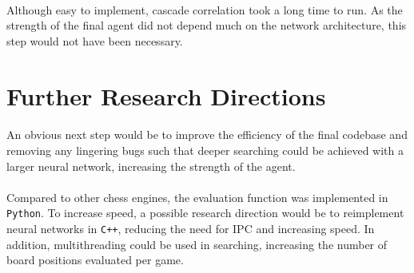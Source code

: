\documentclass[12pt,a4paper]{book}
\begin{document}
\paragraph{} Although easy to implement, cascade correlation took a long time to run. As the strength of the final agent did not depend much on the network architecture, this step would not have been necessary.


\section{Further Research Directions}

\paragraph{} An obvious next step would be to improve the efficiency of the final codebase and removing any lingering bugs such that deeper searching could be achieved with a larger neural network, increasing the strength of the agent.

\paragraph{} Compared to other chess engines, the evaluation function was implemented in \texttt{Python}. To increase speed, a possible research direction would be to reimplement neural networks in \texttt{C++}, reducing the need for IPC and increasing speed. In addition, multithreading could be used in searching, increasing the number of board positions evaluated per game.

\end{document}

